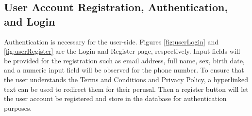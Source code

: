 \subsection{User Account Registration, Authentication, and Login}
Authentication is necessary for the user-side. Figures \ref{fig:userLogin} and \ref{fig:userRegister} are the Login and Register page, respectively. Input fields will be provided for the registration such as email address, full name, sex, birth date, and a numeric input field will be observed for the phone number. To ensure that the user understands the Terms and Conditions and Privacy Policy, a hyperlinked text can be used to redirect them for their perusal. Then a register button will let the user account be registered and store in the database for authentication purposes.
\begin{figure}[!h]
    \centering
    \begin{minipage}[c]{0.50\linewidth}
        \centering

\end{minipage}
\end{figure}
